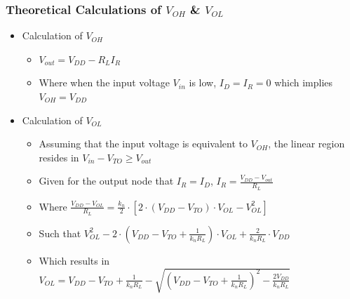 \documentclass[12pt]{article}
\begin{document}
\subsubsection{Theoretical Calculations of $V_{OH}$ \& $V_{OL}$}
\begin{itemize}
\item Calculation of $V_{OH}$
\begin{itemize}
\item $V_{out}=V_{DD}-R_{L}I_{R}$
\item Where when the input voltage $V_{in}$ is low, $I_D=I_R=0$ which implies $V_{OH}=V_{DD}$
\end{itemize}
\item Calculation of $V_{OL}$
\begin{itemize}
\item Assuming that the input voltage is equivalent to $V_{OH}$, the linear region resides in $V_{in}-V_{TO} \geq V_{out}$
\item Given for the output node that $I_R=I_D$, $I_R=\frac{V_{DD}-V_{out}}{R_L}$
\item Where $\frac{V_{DD}-V_{OL}}{R_L}=\frac{k_n}{2} \cdot \left[ 2 \cdot (V_{DD} - V_{TO}) \cdot V_{OL} - V_{OL}^{2} \right]$
\item Such that $V_{OL}^{2} - 2 \cdot \left( V_{DD}-V_{TO}+\frac{1}{k_nR_L} \right) \cdot V_{OL} + \frac{2}{k_nR_L} \cdot V_{DD}$
\item Which results in $V_{OL}=V_{DD}-V_{TO}+\frac{1}{k_nR_L}-\sqrt{\left( V_{DD} - V_{TO} + \frac{1}{k_nR_L} \right)^{2} - \frac{2 V_{DD}}{k_nR_L}}$
\end{itemize}
\end{itemize}
\end{document}
